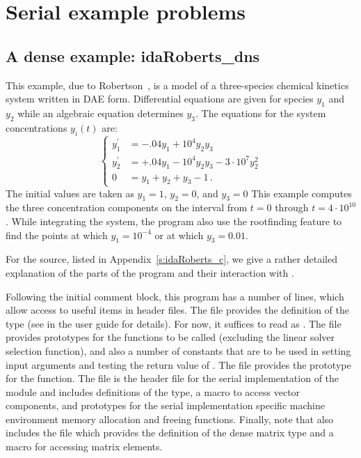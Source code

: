 \section{Serial example problems}\label{s:ex_serial}

\subsection{A dense example: idaRoberts\_dns}\label{ss:idaRoberts}

This example, due to Robertson~\cite{Rob:66}, is a model of a three-species 
chemical kinetics system written in DAE form. Differential equations are given 
for species $y_1$ and $y_2$ while an algebraic equation determines $y_3$. The 
equations for the system concentrations $y_i(t)$ are:
\begin{equation}\label{e:idaRoberts_DAE}
\begin{cases}
  y^\prime_1 &= -.04 y_1 + 10^4 y_2 y_3   \\
  y^\prime_2 &= +.04 y_1 - 10^4 y_2 y_3 - 3 \cdot 10^7 y_2^2  \\
  0 &=  y_1 + y_2 + y_3 - 1 \, .
\end{cases}
\end{equation}
The initial values are taken as $y_1 = 1$, $y_2 = 0$, and $y_3 = 0$
This example computes the three concentration components on the interval
from $t=0$ through $t=4 \cdot 10^{10}$.
While integrating the system, the program also use the rootfinding
feature to find the points at which $y_1 = 10^{-4}$ or at which
$y_3 = 0.01$.

For the source, listed in Appendix~\ref{s:idaRoberts_c}, we give a rather detailed
explanation of the parts of the program and their interaction with {\ida}.

Following the initial comment block, this program has a number
of  lines, which allow access to useful items in {\ida}
header files.  The  file provides the definition of the
type  (see  in the user guide \cite{ida_ug}
for details).  For now, it suffices to read  as .
The  file provides prototypes for the {\ida}
functions to be called (excluding the linear solver selection
function), and also a number of constants that are to be used in
setting input arguments and testing the return value of .
The  file provides the prototype for the  function.
The  file is the header file for the serial
implementation of the {\nvector} module and includes definitions of the 
 type, a macro to access vector components, and prototypes 
for the serial implementation specific machine environment memory allocation
and freeing functions.
Finally, note that  also includes the  file which 
provides the definition of the dense matrix type  and a macro for 
accessing matrix elements.

